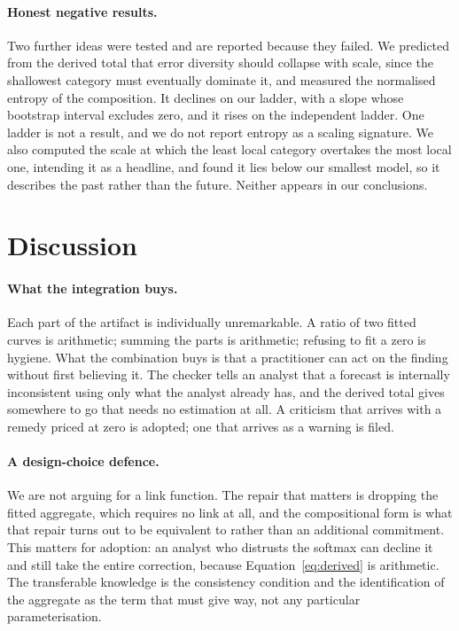 \documentclass[11pt]{article}
\begin{document}
\paragraph{Honest negative results.}
Two further ideas were tested and are reported because they failed. We predicted
from the derived total that error diversity should collapse with scale, since the
shallowest category must eventually dominate it, and measured the normalised entropy of
the composition. It declines on our ladder, with a slope whose bootstrap interval
excludes zero, and it rises on the independent ladder. One ladder is not a result,
and we do not report entropy as a scaling signature. We also computed the scale at
which the least local category overtakes the most local one, intending it as a
headline, and found it lies below our smallest model, so it describes the past
rather than the future. Neither appears in our conclusions.

\section{Discussion}
\label{sec:discussion}

\paragraph{What the integration buys.}
Each part of the artifact is individually unremarkable. A ratio of two fitted curves
is arithmetic; summing the parts is arithmetic; refusing to fit a zero is hygiene. What the
combination buys is that a practitioner can act on the finding without first
believing it. The checker tells an analyst that a forecast is internally
inconsistent using only what the analyst already has, and the derived total gives
somewhere to go that needs no estimation at all. A criticism that arrives with a
remedy priced at zero is adopted; one that arrives as a warning is filed.

\paragraph{A design-choice defence.}
We are not arguing for a link function. The repair that matters is dropping the
fitted aggregate, which requires no link at all, and the compositional form is what
that repair turns out to be equivalent to rather than an additional commitment. This
matters for adoption: an analyst who distrusts the softmax can decline it and still
take the entire correction, because Equation~\ref{eq:derived} is arithmetic. The
transferable knowledge is the consistency condition and the identification of the
aggregate as the term that must give way, not any particular parameterisation.
\end{document}
